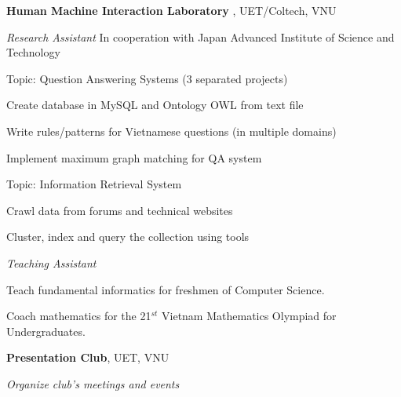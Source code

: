 \documentclass[9pt]{extreport}
\renewcommand{\section}[2]%
		{\pagebreak[2]\vspace{0.8\baselineskip}%
			\hspace{0in}%
			\marginpar{
				\raggedright \emph{#1}}#2}
\newenvironment{innerlist}[1][\enskip\textbullet]%
		{\vspace{0.2\baselineskip}\begin{compactitem}[#1]}{\end{compactitem}}
\begin{document}
			\section{2011-2013}
			\textbf{Human Machine Interaction Laboratory }, UET/Coltech, VNU
			\begin{innerlist}
				\item[] \textit{Research Assistant} \hfill In cooperation with Japan Advanced Institute of Science and Technology
				\begin{innerlist}
					\item Topic: Question Answering Systems (3 separated projects)
					\begin{innerlist}
						\item Create database in MySQL and Ontology OWL from text file
						\item Write rules/patterns for Vietnamese questions (in multiple domains)
						\item Implement maximum graph matching for QA system
					\end{innerlist}
					\item Topic: Information Retrieval System
					\begin{innerlist}
						\item Crawl data from forums and technical websites
						\item Cluster, index and query the collection using tools
					\end{innerlist}
				\end{innerlist}
			\end{innerlist}
			\vspace{.4\baselineskip}
			\begin{innerlist}
				\item[] \textit{Teaching Assistant} %
				\begin{innerlist}
					\item Teach fundamental informatics for freshmen of Computer Science.
					\item Coach mathematics for the 21$^{st}$ Vietnam Mathematics Olympiad for Undergraduates.
				\end{innerlist}
			\end{innerlist}
			
			
			\section{2011}
			\textbf{Presentation Club}, UET, VNU
			\begin{innerlist}
				\item[] \textit{Organize club's meetings and events} %
			\end{innerlist}
			
\end{document}
